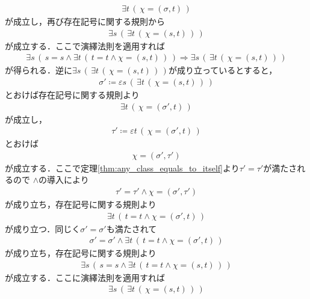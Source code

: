 \begin{prf}
		\begin{align}
			\exists t\, (\, \chi = (\sigma,t)\, )
		\end{align}
		が成立し，再び存在記号に関する規則から
		\begin{align}
			\exists s\, \left(\, \exists t\, (\, \chi = (s,t)\, )\, \right)
		\end{align}
		が成立する．ここで演繹法則を適用すれば
		\begin{align}
			\exists s\, \left(\, s = s \wedge \exists t\, (\, t=t \wedge \chi=(s,t)\, )\, \right)
			\Longrightarrow \exists s\, \left(\, \exists t\, (\, \chi=(s,t)\, )\, \right)
		\end{align}
		が得られる．逆に$\exists s\, \left(\, \exists t\, (\, \chi=(s,t)\, )\, \right)$が成り立っているとすると，
		\begin{align}
			\sigma' \coloneqq \varepsilon s\, \left(\, \exists t\, (\, \chi=(s,t)\, )\, \right)
		\end{align}
		とおけば存在記号に関する規則より
		\begin{align}
			\exists t\, (\, \chi=(\sigma',t)\, )
		\end{align}
		が成立し，
		\begin{align}
			\tau' \coloneqq \varepsilon t\, (\, \chi=(\sigma',t)\, )
		\end{align}
		とおけば
		\begin{align}
			\chi = (\sigma',\tau')
		\end{align}
		が成立する．ここで定理\ref{thm:any_class_equals_to_itself}より$\tau' = \tau'$が満たされるので
		$\wedge$の導入により
		\begin{align}
			\tau' = \tau' \wedge \chi = (\sigma',\tau')
		\end{align}
		が成り立ち，存在記号に関する規則より
		\begin{align}
			\exists t\, (\, t = t \wedge \chi = (\sigma',t)\, )
		\end{align}
		が成り立つ．同じく$\sigma' = \sigma'$も満たされて
		\begin{align}
			\sigma' = \sigma' \wedge \exists t\, (\, t = t \wedge \chi = (\sigma',t)\, )
		\end{align}
		が成り立ち，存在記号に関する規則より
		\begin{align}
			\exists s\, \left(\, s = s \wedge \exists t\, (\, t = t \wedge \chi = (s,t)\, )\, \right)
		\end{align}
		が成立する．ここに演繹法則を適用すれば
		\begin{align}
			\exists s\, \left(\, \exists t\, (\, \chi = (s,t)\, )\, \right)

\end{align}
\end{prf}
